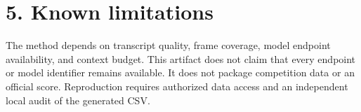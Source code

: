 \documentclass[10pt]{article}
\begin{document}
\section*{5. Known limitations}

The method depends on transcript quality, frame coverage, model endpoint
availability, and context budget. This artifact does not claim that every
endpoint or model identifier remains available. It does not package
competition data or an official score. Reproduction requires authorized data
access and an independent local audit of the generated CSV.
\end{document}
